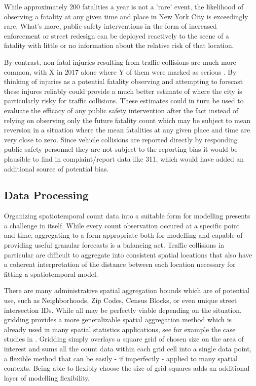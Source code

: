 While approximately 200 fatalities a year is not a 'rare' event, the likelihood of observing a fatality at any given time and place in New York City is exceedingly rare. What's more, public safety interventions in the form of increased enforcement or street redesign can be deployed reactively to the scene of a fatality with little or no information about the relative risk of that location. \par

By contrast, non-fatal injuries resulting from traffic collisions are much more common, with X in 2017 alone where Y of them were marked as serious . By thinking of injuries as a potential fatality observing and attempting to forecast these injures reliably could provide a much better estimate of where the city is particularly risky for traffic collisions. These estimates could in turn be used to evaluate the efficacy of any public safety intervention after the fact instead of relying on observing only the future fatality count which may be subject to mean reversion in a situation where the mean fatalities at any given place and time are very close to zero. Since vehicle collisions are reported directly by responding public safety personnel they are not subject to the reporting bias it would be plausible to find in complaint/report data like 311, which would have added an additional source of potential bias.\par

\subsection{Data Processing}

Organizing spatiotemporal count data into a suitable form for modelling presents a challenge in itself. While every count observation occured at a specific point and time, aggregating to a form appropriate both for modelling and capable of providing useful granular forecasts is a balancing act. Traffic collisions in particular are difficult to aggregate into consistent spatial locations that also have a coherent interpretation of the distance between each location necessary for fitting a spatiotemporal model. \par

There are many administrative spatial aggregation bounds which are of potential use, such as Neighborhoods, Zip Codes, Census Blocks, or even unique street intersection IDs. While all may be perfectly viable depending on the situation, gridding provides a more generalizable spatial aggregation method which is already used in many spatial statistics applications, see for example the case studies in \cite{blangiardo_2015}. Gridding simply overlays a square grid of chosen size on the area of interest and sums all the count data within each grid cell into a single data point, a flexible method that can be easily - if imperfectly - applied to many spatial contexts. Being able to flexibly choose the size of grid squares adds an additional layer of modelling flexibility. \par

